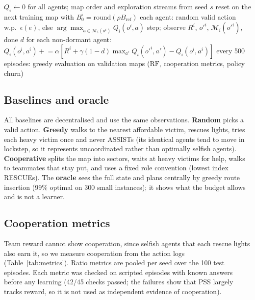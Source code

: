 \documentclass{article}
\newcommand{\Bref}{B_{\mathrm{ref}}}
\newcommand{\RF}{\mathrm{RF}}
\begin{document}
\begin{algorithm}[h]
\caption{IQL training for one run (seed $s$, budget level $\rho$)}
\label{alg:iql}
\begin{algorithmic}[1]
\State $Q_i\gets 0$ for all agents; map order and exploration streams from seed $s$
  \State reset on the next training map with $B^i_0=\mathrm{round}(\rho\Bref)$
    \State each agent: random valid action w.p.\ $\epsilon(e)$, else $\arg\max_{a\in\mathcal{M}_i(o^i)}Q_i(o^i,a)$
    \State step; observe $R^i$, $o'^i$, $\mathcal{M}_i(o'^i)$, done $d$
    \State for each non-dormant agent: $Q_i(o^i,a^i)\mathrel{+}=\alpha[R^i+\gamma(1-d)\max_{a'}Q_i(o'^i,a')-Q_i(o^i,a^i)]$
  \EndWhile
  \State every 500 episodes: greedy evaluation on validation maps ($\RF$, cooperation metrics, policy churn)
\EndFor
\end{algorithmic}
\end{algorithm}

\subsection{Baselines and oracle}
All baselines are decentralised and use the same observations. \textbf{Random} picks a valid action. \textbf{Greedy}
walks to the nearest affordable victim, rescues lights, tries each heavy victim once and never ASSISTs (its identical
agents tend to move in lockstep, so it represents uncoordinated rather than optimally selfish agents).
\textbf{Cooperative} splits the map into sectors, waits at heavy victims for help, walks to teammates that stay put,
and uses a fixed role convention (lowest index RESCUEs). The \textbf{oracle} sees the full state and plans centrally by
greedy route insertion (99\% optimal on 300 small instances); it shows what the budget allows and is not a learner.

\subsection{Cooperation metrics}\label{sec:metrics}
Team reward cannot show cooperation, since selfish agents that each rescue lights also earn it, so we measure
cooperation from the action logs (Table~\ref{tab:metrics}). Ratio metrics are pooled per seed over the 100 test
episodes. Each metric was checked on scripted episodes with known answers before any learning (42/45 checks passed;
the failures show that PSS largely tracks reward, so it is not used as independent evidence of cooperation).
\end{document}
